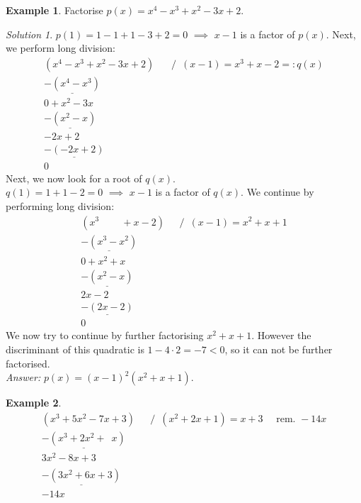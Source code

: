 \documentclass[
  english,
  12pt,
  oneside]{book}
\theoremstyle{definition}
\theoremstyle{definition}
\newtheorem{example}{Example}[chapter]
\theoremstyle{definition}
\theoremstyle{definition}
\theoremstyle{remark}
\newtheorem*{solution}{Solution}
\begin{document}
\begin{example}
Factorise \(p(x)=x^4-x^3+x^2-3x+2\).
\end{example}

\begin{solution}
\(p(1)=1-1+1-3+2=0\) \(\implies\) \(x-1\) is a factor of \(p(x)\). Next, we perform long division:
\[\begin{array}{rl}
(x^4-x^3+x^2-3x+2) & / \,\,\,(x-1) = x^3+x-2 =: q(x)\\
\underline{-(x^4-x^3)}\phantom{+x^2-3x+2x}\\
0 + x^2-3x\phantom{+2m}\\
\underline{-(x^2-x)}\phantom{+2x}\\
-2x+2\phantom{x}\\
\underline{-(-2x+2)}\\
0\phantom{x}
\end{array}\]
Next, we now look for a root of \(q(x)\).\\
\(q(1) = 1+1-2=0\) \(\implies\) \(x-1\) is a factor of \(q(x)\). We continue by performing long division:
\[\begin{array}{rl}
(x^3\phantom{-xm}+x-2) & / \,\,\,(x-1) = x^2+x+1\\
\underline{-(x^3-x^2)}\phantom{x+2xx}\\
0 + x^2+x\phantom{+2m}\\
\underline{-(x^2-x)}\phantom{+2x}\\
 2x-2\phantom{x}\\
\underline{-(2x-2)}\\
0\phantom{x}
\end{array}\]
We now try to continue by further factorising \(x^2+x+1\). However the discriminant of this quadratic is \(1-4\cdot2=-7<0\), so it can not be further factorised.\\
\emph{Answer:} \(p(x)=(x-1)^2(x^2+x+1)\).
\end{solution}

\begin{example}
\[\begin{array}{rl}
(x^3+5x^2-7x+3) & / \,\,\,(x^2+2x+1) = x+3\quad\text{ rem. }-14x\\
\underline{-(x^3+2x^2+\phantom{7}x)}\phantom{+3)}\\
3x^2-8x+3\phantom{)}\\
\underline{-(3x^2+6x+3)}\\
-14x\phantom{+3m}
\end{array}\]
\end{example}
\end{document}
